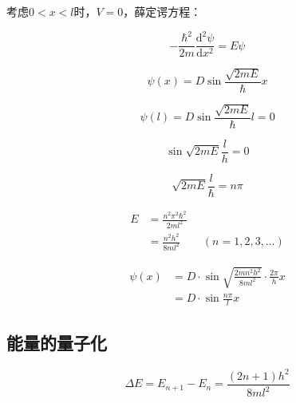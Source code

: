 \documentclass[a4paper]{ctexrep}
\renewcommand{\d}{\mathrm{d}}
\begin{document}
    考虑$0 < x < l$时，$V=0$，薛定谔方程：

    \[
        -\frac{\hbar^2}{2m} \frac{\d^2 \psi}{\d x^2} = E \psi
    \]

    \[
        \psi(x) = D \sin \frac{\sqrt{2mE}}{\hbar} x   
    \]

    \[
        \psi(l) = D \sin \frac{\sqrt{2mE}}{\hbar} l = 0
    \]

    \[
        \sin \sqrt{2mE} \frac{l}{h} = 0
    \]

    \[
        \sqrt{2mE} \frac{l}{\hbar} = n \pi 
    \]

    \begin{align*}
        E &= \frac{n^2\pi^2\hbar^2}{2ml^2} \\
        &= \frac{n^2h^2}{8ml^2} \qquad (n = 1, 2, 3, \dots)
    \end{align*}

    \begin{align*}
        \psi (x) &= D \cdot \sin \sqrt{\frac{2mn^2h^2}{8ml^2} } \cdot \frac{2\pi}{h} x \\
        &= D \cdot \sin \frac{n\pi}{l} x
    \end{align*}

    \subsection{能量的量子化}

    \[
        \Delta E = E_{n + 1} - E_n = \frac{(2n + 1)h^2}{8ml^2}  
    \]
\end{document}
